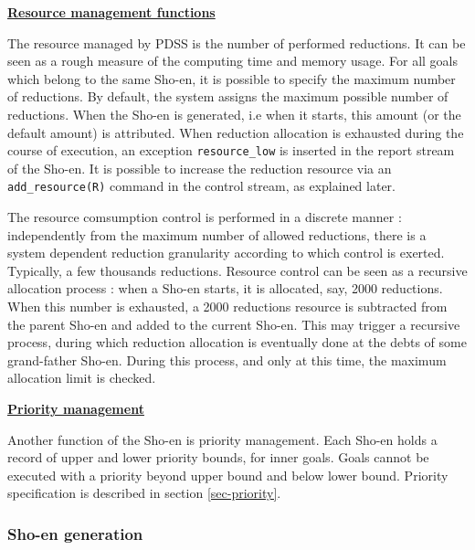 \noindent\underline{\bf Resource management functions}
\vspace{1ex}\par
The resource managed by PDSS is the number of
performed reductions. It can be seen as a rough measure of
the computing time and memory usage.
For all goals which belong to the same Sho-en, it is possible
to specify the maximum number of reductions.
By default,
the system assigns the maximum possible number of reductions. When the Sho-en
is generated, i.e when it starts, this amount (or the default amount) is
attributed. When reduction allocation is exhausted during the course of
execution, an exception \verb|resource_low|
 is inserted in the report stream
of the Sho-en. It is possible to increase the reduction resource via an
\verb|add_resource(R)| command in the control stream,
as explained later.

The resource comsumption control is performed in a discrete manner 
: independently from the maximum number of allowed reductions,
there is a system dependent reduction granularity according to
which control is exerted. Typically, a few thousands reductions.
Resource control can be seen as a recursive allocation process :
when a Sho-en starts, it is allocated, say, 2000 reductions.
When this number is exhausted, a 2000 reductions resource is subtracted
from the parent Sho-en and added to the current Sho-en.
This may trigger a recursive process, during which
reduction allocation is eventually done at the debts of some grand-father
Sho-en. During this process, and only at this time, the maximum allocation
limit is checked. 
\vspace{1ex}

\noindent\underline{\bf Priority management}
\vspace{1ex}\par
Another function of the Sho-en is priority management. Each Sho-en holds a
record of upper and lower priority bounds, for inner goals. Goals
cannot be executed with a priority beyond upper bound and below lower bound.
Priority specification is described in section \ref{sec-priority}.

\subsubsection{Sho-en generation}

